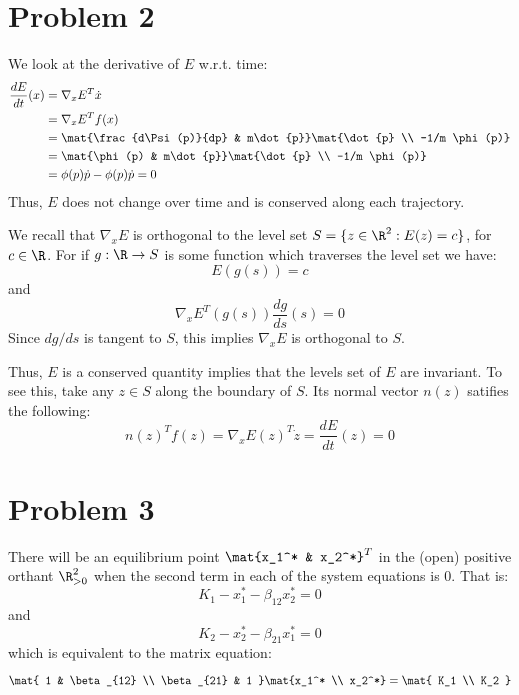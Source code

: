 \documentclass{homework}
\begin{document}
\section{Problem 2}
\begin{letterenum}
\item We look at the derivative of $E$ w.r.t. time:
\begin{align*}
    \frac{dE}{dt}(x) &= \nabla_x E^T \dot{x} \\
        &= \nabla_x E^T f(x) \\
        &= \mat{\frac{d\Psi(p)}{dp} & m\dot{p}} \mat{\dot{p} \\ -1/m \phi(p)} \\
        &= \mat{\phi(p) & m\dot{p}} \mat{\dot{p} \\ -1/m \phi(p)} \\
        &= \phi(p) \dot{p} - \phi(p) \dot{p} = 0
\end{align*}
Thus, $E$ does not change over time and is conserved along each trajectory.

\item We recall that $\nabla_x E$ is orthogonal to the level set
$S = \{z\in\R^2: E(z) = c\}$, for $c\in\R$. For if $g: \R \to S$ is some function
which traverses the level set we have:
\begin{equation*}
    E(g(s)) = c
\end{equation*}
and \begin{equation*}
    \nabla_x E^T(g(s)) \frac{dg}{ds}(s) = 0
\end{equation*}
Since $dg/ds$ is tangent to $S$, this implies $\nabla_x E$ is orthogonal to $S$.

Thus, $E$ is a conserved quantity implies that the levels set of $E$ are invariant.
To see this, take any $z\in S$ along the boundary of $S$. Its normal vector
$n(z)$ satifies the following:
\begin{equation*}
    n(z)^T f(z) = \nabla_x E(z)^T \dot{z} = \frac{dE}{dt}(z) = 0
\end{equation*}
\end{letterenum}

\section{Problem 3}
There will be an equilibrium point $\mat{x_1^* & x_2^*}^T$ in the (open) positive
orthant $\R_{>0}^2$ when the second term in each of the system equations is 0.
That is:
\begin{equation*}
    K_1 - x_1^* - \beta_{12} x_2^* = 0
\end{equation*}
and 
\begin{equation*}
    K_2 - x_2^* - \beta_{21} x_1^* = 0
\end{equation*}
which is equivalent to the matrix equation:
\begin{equation*}
    \mat{
        1 & \beta_{12} \\
        \beta_{21} & 1
    } \mat{x_1^* \\ x_2^*} = \mat{
        K_1 \\ K_2
    }
\end{equation*}
\end{document}
